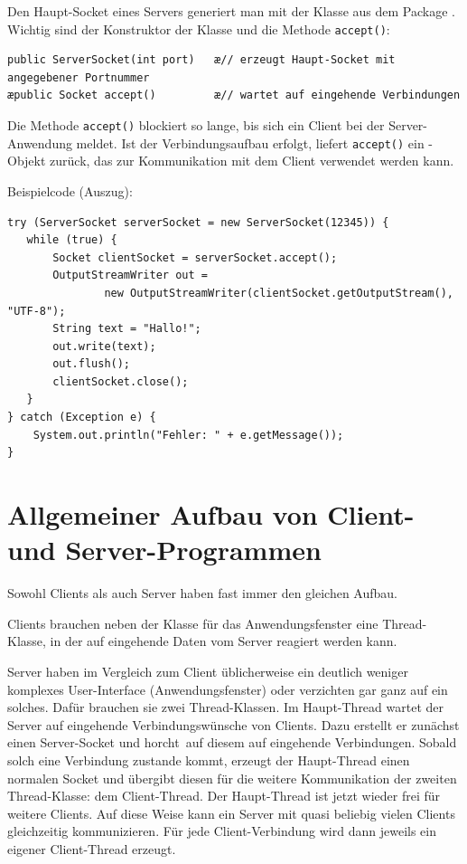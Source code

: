 Den Haupt-Socket eines Servers generiert man mit der Klasse
 aus dem Package . Wichtig sind der
Konstruktor der Klasse und die Methode \lstinline|accept()|:

\begin{lstlisting}
public ServerSocket(int port)   æ// erzeugt Haupt-Socket mit angegebener Portnummer 
æpublic Socket accept()	        æ// wartet auf eingehende Verbindungen
\end{lstlisting}

Die Methode \lstinline|accept()| blockiert so lange, bis sich ein Client bei der
Server-Anwendung meldet. Ist der Verbindungsaufbau erfolgt, liefert
\lstinline|accept()| ein -Objekt zurück, das zur
Kommunikation mit dem Client verwendet werden kann.

Beispielcode (Auszug):

\begin{lstlisting}
try (ServerSocket serverSocket = new ServerSocket(12345)) {
   while (true) {
       Socket clientSocket = serverSocket.accept();
       OutputStreamWriter out = 
               new OutputStreamWriter(clientSocket.getOutputStream(), "UTF-8");
       String text = "Hallo!";
       out.write(text);
       out.flush();
       clientSocket.close();
   }
} catch (Exception e) {
    System.out.println("Fehler: " + e.getMessage());
}
\end{lstlisting}


\section{Allgemeiner Aufbau von Client- und Server-Programmen}

Sowohl Clients als auch Server haben fast immer den gleichen Aufbau. 

\begin{compactitem}
\item Clients brauchen neben der Klasse für das Anwendungsfenster eine
Thread-Klasse, in der auf eingehende Daten vom Server reagiert werden kann.

\item Server haben im Vergleich zum Client üblicherweise ein deutlich weniger
komplexes User-Interface (Anwendungsfenster) oder verzichten gar ganz auf ein
solches. Dafür brauchen sie zwei Thread-Klassen. Im Haupt-Thread wartet der
Server auf eingehende Verbindungswünsche von Clients. Dazu erstellt er zunächst
einen Server-Socket und \glqq horcht\grqq\ auf diesem auf eingehende
Verbindungen. Sobald solch eine Verbindung zustande kommt, erzeugt der
Haupt-Thread einen normalen Socket und übergibt diesen für die weitere
Kommunikation der zweiten Thread-Klasse: dem Client-Thread. Der Haupt-Thread
ist jetzt wieder frei für weitere Clients. Auf diese Weise kann ein Server mit
quasi beliebig vielen Clients gleichzeitig kommunizieren. Für jede
Client-Verbindung wird dann jeweils ein eigener Client-Thread erzeugt.
\end{compactitem}

